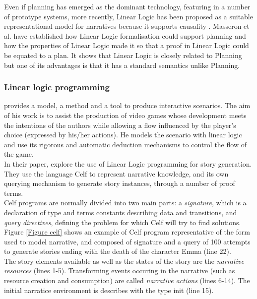 \documentclass[11pt]{article}
\begin{document}
Even if planning has emerged as the dominant technology, featuring in a number of prototype systems, more recently, Linear Logic has been proposed as a suitable representational model for narratives because it supports causality \citep{Bosser10}. Masseron et al. \citep{Masseron93} have established how Linear Logic formalisation could support planning and how the properties of Linear Logic made it so that a proof in Linear Logic could be equated to a plan. It shows that Linear Logic is closely related to Planning but one of its advantages is that it has a standard semantics unlike Planning. 
\subsubsection{Linear logic programming}
\citeauthor{Dang13} provides a model, a method and a tool to produce interactive scenarios. The aim of his work is to assist the production of video games whose development meets the intentions of the authors while allowing a flow influenced by the player's choice (expressed by his/her actions). He models the scenario with linear logic and use its rigorous and automatic deduction mechanisms to control the flow of the game.\\

In their paper, \citeauthor{Martens13} explore the use of Linear Logic programming for story generation. They use the language Celf \citep{Schack08} to represent narrative knowledge, and its own querying mechanism to generate story instances, through a number of proof terms.\\

Celf programs are normally divided into two main parts: a \textit{signature}, which is a declaration of type and terms constants describing data and transitions, and \textit{query directives}, defining the problem for which Celf will try to find solutions.\\

Figure \ref{Figure celf} shows an example of Celf program representative of the form used to model narrative, and composed of signature and a query of 100 attempts to generate stories ending with the death of the character Emma (line 22). \\

The story elements available as well as the states of the story are the \textit{narrative resources} (lines 1-5). Transforming events occuring in the narrative (such as resource creation and consumption) are called \textit{narrative actions} (lines 6-14). The initial narratice environment is describes with the type init (line 15).\\
\end{document}
